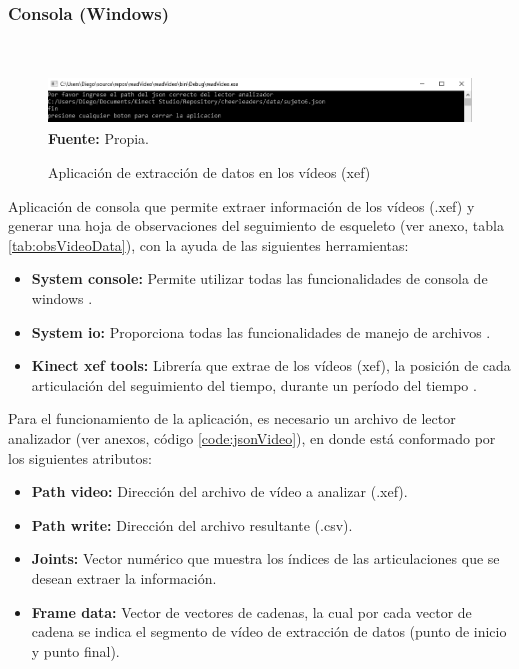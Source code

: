 \subsubsection{Consola (Windows)}\mbox{} \\ \label{ins:cons}
\begin{figure}[H]
	\caption{Aplicaci\'on de extracci\'on de datos en los v\'ideos (xef)}
	\label{fig:appConsole}
	\centering
	\includegraphics[width=460px,height=50px]{graphics/appConsole.PNG} \\
	\textbf{Fuente:} Propia.
\end{figure} 
Aplicaci\'on de consola que permite extraer informaci\'on de los v\'ideos (.xef) y generar una hoja de observaciones del seguimiento de esqueleto (ver anexo, tabla \ref{tab:obsVideoData}), con la ayuda de las siguientes herramientas:
\begin{itemize}
\item \textbf{System console:} Permite utilizar todas las funcionalidades de consola de windows \cite{windowConsole2019}.
\item \textbf{System io:} Proporciona todas las  funcionalidades de manejo de archivos \cite{windowIO2019}.
\item \textbf{Kinect xef tools:} Librer\'ia que extrae de los v\'ideos (xef), la posici\'on de cada articulaci\'on del seguimiento del tiempo, durante un per\'iodo del tiempo \cite{kinectXEFTools}.
\end{itemize}
Para el funcionamiento de la aplicaci\'on, es necesario un archivo de lector analizador (ver anexos, c\'odigo \ref{code:jsonVideo}), en donde est\'a conformado por los siguientes atributos:
\begin{itemize}
\item \textbf{Path video:} Direcci\'on del archivo  de v\'ideo a analizar (.xef).
\item \textbf{Path write:} Direcci\'on del archivo  resultante (.csv).
\item \textbf{Joints:} Vector num\'erico que muestra los \'indices de las articulaciones que se desean extraer la informaci\'on.
\item \textbf{Frame data:} Vector de vectores de cadenas, la cual por cada vector de cadena se indica el segmento de v\'ideo de extracci\'on de datos (punto de inicio y punto final).
\end{itemize}
